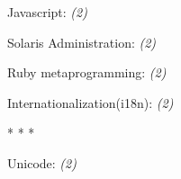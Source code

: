 \documentclass[]{article}
\begin{document}
       

 Javascript: \emph{(2)}
  \label{javascript2}

       

 Solaris Administration: \emph{(2)}
  \label{solarisadministration2}

       

 Ruby metaprogramming: \emph{(2)}
  \label{rubymetaprogramming2}

       

 Internationalization(i18n): \emph{(2)}
  \label{internationalization(i18n)2}

       

 \begin{center}* * * \end{center}
 Unicode: \emph{(2)}
  \label{unicode2}

       
\end{document}
